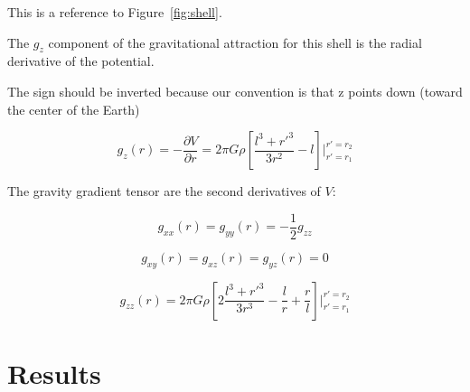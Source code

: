 \documentclass[paper,twocolumn,twoside]{geophysics}
\begin{document}
This is a reference to Figure~\ref{fig:shell}.

The $g_z$ component of the gravitational attraction for this shell is the
radial derivative of the potential.

The sign should be inverted because our convention is that z points down
(toward the center of the Earth)

\begin{equation}
    g_z(r) = -\dfrac{\partial V}{\partial r} = 2\pi G \rho \left[ \dfrac{l^3 +
            {r'}^3}{3r^2} - l \right] \Biggr \rvert_{r'=r_1}^{r'=r_2}
    \label{eq:halfshell-gz}
\end{equation}

The gravity gradient tensor are the second derivatives of $V$:

\begin{equation}
    g_{xx}(r) = g_{yy}(r) = -\dfrac{1}{2} g_{zz}
\end{equation}

\begin{equation}
    g_{xy}(r) = g_{xz}(r) = g_{yz}(r) = 0
\end{equation}

\begin{equation}
    g_{zz}(r) = 2\pi G \rho \left[ 2\dfrac{l^3 + {r'}^3}{3r^3} - \dfrac{l}{r} +
    \dfrac{r}{l} \right] \Biggr \rvert_{r'=r_1}^{r'=r_2}
\end{equation}



\section{Results}


\end{document}

